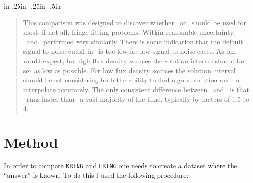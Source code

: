 %
\parskip 4mm
\linewidth 6.5in                     %
\textwidth 6.5in                     %
 in                  %
\marginparsep 0in
\oddsidemargin .25in                 %
\evensidemargin -.25in
\topmargin -.5in
\headsep 0.25in
\headheight 0.25in
\parindent 0in
\newcommand{\normalstyle}{\baselineskip 4mm \parskip 2mm \normalsize}
\newcommand{\tablestyle}{\baselineskip 2mm \parskip 1mm \small }
%
%


\begin{abstract}
This comparison was designed to discover whether \KR\ or \FR\ should
be used for most, if not all, fringe fitting problems.  Within reasonable
uncertainty, \FR\ and \KR\ performed very similarly.  There
is some indication that the default signal to noise cutoff in \KR\ is
too low for low signal to noise cases.  As one would expect, for high
flux density sources the solution
interval should be set as low as possible.  For low flux density sources
the solution interval should be set considering both the ability to find
a good solution and to interpolate accurately.  The only consistent
difference between \KR\ and \FR\ is that \KR\ runs faster than \FR\ a vast
majority of the time, typically by factors of 1.5 to 4.
\end{abstract}

\section{Method}

In order to compare {\tt KRING} and {\tt FRING} one needs to
create a dataset where the ``answer'' is known.  To do this I
used the following procedure:

